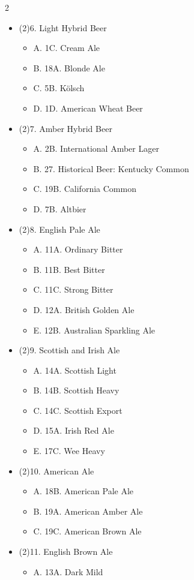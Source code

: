 \begin{multicols*}{2}
\begin{itemize}[noitemsep]
\item[] (2)6. Light Hybrid Beer
\begin{itemize}
  \item[] A. 1C. Cream Ale
  \item[] B. 18A. Blonde Ale
  \item[] C. 5B. Kölsch
  \item[] D. 1D. American Wheat Beer
\end{itemize}
\item[] (2)7. Amber Hybrid Beer
\begin{itemize}
  \item[] A. 2B. International Amber Lager
  \item[] B. 27. Historical Beer: Kentucky Common
  \item[] C. 19B. California Common
  \item[] D. 7B. Altbier
\end{itemize}
\item[] (2)8. English Pale Ale
\begin{itemize}
  \item[] A. 11A. Ordinary Bitter
  \item[] B. 11B. Best Bitter
  \item[] C. 11C. Strong Bitter
  \item[] D. 12A. British Golden Ale
  \item[] E. 12B. Australian Sparkling Ale
\end{itemize}
\item[] (2)9. Scottish and Irish Ale
\begin{itemize}
  \item[] A. 14A. Scottish Light
  \item[] B. 14B. Scottish Heavy
  \item[] C. 14C. Scottish Export
  \item[] D. 15A. Irish Red Ale
  \item[] E. 17C. Wee Heavy
\end{itemize}
\item[] (2)10. American Ale
\begin{itemize}
  \item[] A. 18B. American Pale Ale
  \item[] B. 19A. American Amber Ale
  \item[] C. 19C. American Brown Ale
\end{itemize}
\item[] (2)11. English Brown Ale
\begin{itemize}
  \item[] A. 13A. Dark Mild

\end{itemize}
\end{itemize}
\end{multicols*}
